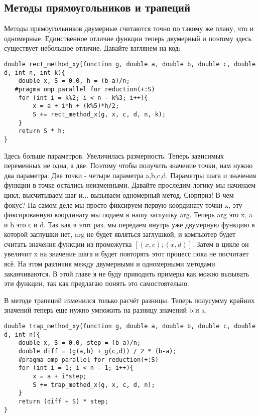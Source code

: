 \documentclass{article}
\begin{document}
\subsection{Методы прямоугольников и трапеций}
Методы прямоугольников двумерные считаются точно по такому же плану, что и одномерные. Единственное отличие функции теперь двумерный и поэтому здесь существует небольшое отличие. Давайте взглянем на код:
\begin{lstlisting}
double rect_method_xy(function g, double a, double b, double c, double d, int n, int k){
    double x, S = 0.0, h = (b-a)/n;
   #pragma omp parallel for reduction(+:S)
    for (int i = k%2; i < n - k%3; i++){
        x = a + i*h + (k%5)*h/2;
        S += rect_method_x(g, x, c, d, n, k);
    }
    return S * h;
}
\end{lstlisting}
Здесь больше параметров. Увеличилась размерность. Теперь зависимых переменных не одна, а две. Поэтому чтобы получить значение точки, нам нужно два параметра. Две точки - четыре параметра a,b,c,d. Параметры шага и значения функции в точке остались неизменными. Давайте проследим логику мы начинаем цикл, высчитываем шаг и... вызываем одномерный метод. Сюрприз! В чем фокус? На самом деле мы просто фиксируем первую координату точки x, эту фиксированную координату мы подаем в нашу заглушку arg. Теперь arg это x, a и b это с и d. Так как в этот раз, мы передаем внутрь уже двумерную функцию в которой заглушки нет, arg не будет являться заглушкой, и компьютер будет считать значения функции из промежутка $[(x,c);(x,d)]$. Затем в цикле он увеличит x на значение шага и будет повторять этот процесс пока не посчитает всё. На этом различия между двумерными и одномерными методами заканчиваются. В этой главе я не буду приводить примеры как можно вызывать эти функции, так как предлагаю понять это самостоятельно. 

В методе трапеций изменился только расчёт разницы. Теперь полусумму крайних значений теперь еще нужно умножить на разницу значений b и a.
\begin{lstlisting}
double trap_method_xy(function g, double a, double b, double c, double d, int n){
    double x, S = 0.0, step = (b-a)/n;
    double diff = (g(a,b) + g(c,d)) / 2 * (b-a);
    #pragma omp parallel for reduction(+:S)
    for (int i = 1; i < n - 1; i++){
        x = a + i*step;
        S += trap_method_x(g, x, c, d, n);
    }
    return (diff + S) * step;
}
\end{lstlisting}
\end{document}
